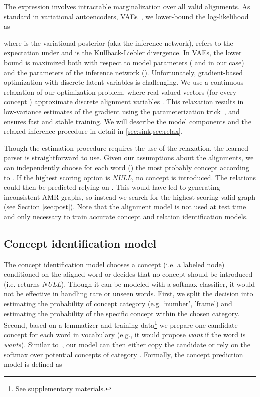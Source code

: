 \documentclass[11pt,a4paper]{article}
\begin{document}
The expression involves intractable marginalization over all valid alignments. 
As standard in variational autoencoders, VAEs~\cite{kingma2013auto}, we lower-bound the log-likelihood as 

where  is the variational posterior (aka the inference network),  refers to the expectation under  and  is the Kullback-Liebler divergence. In VAEs, the lower bound is maximized both with respect to model parameters ( and  in our case) and the parameters of the inference network (). 
Unfortunately, gradient-based optimization with discrete latent variables is challenging. We use a continuous relaxation of our optimization problem, where real-valued vectors  (for every concept ) approximate discrete alignment variables . This relaxation results in low-variance estimates of the gradient using the parameterization trick~\cite{kingma2013auto}, and ensures fast and stable training.
We will describe the model components and the relaxed inference procedure in detail in  \cref{sec:sink,sec:relax}.



Though the estimation procedure requires the use of the relaxation, the learned parser is straightforward to use. Given our assumptions about the alignments, we can independently choose for each word  () the most probably concept according to . If the highest scoring option is {\it NULL}, no concept is introduced. The relations could then be predicted relying on . This would have led to generating inconsistent AMR graphs, so instead we search for the highest scoring valid graph (see Section  \ref{sec:post}). Note that the alignment model  is not used at test time and only necessary to train accurate concept and relation identification models.



\subsection{Concept identification model}
\label{sect:concept-ident}

The concept identification model chooses a concept  (i.e. a labeled node) conditioned on the aligned word  or decides that no concept should be introduced (i.e. returns \textit{NULL}). Though it can be modeled with a softmax classifier, it would not be effective in handling rare or unseen words. First, we split the decision into estimating the probability of concept category  (e.g. `number', 'frame') and estimating the probability of the specific concept within the chosen category. Second, based on a lemmatizer and training data\footnote{See supplementary materials.}
we prepare one candidate concept  for each word  in vocabulary (e.g., it would propose {\it want} if the word is {\it wants}).  Similar to~, our  model can then either copy the candidate   or rely on the softmax over potential concepts of category . Formally, the concept prediction model is defined as
\end{document}
